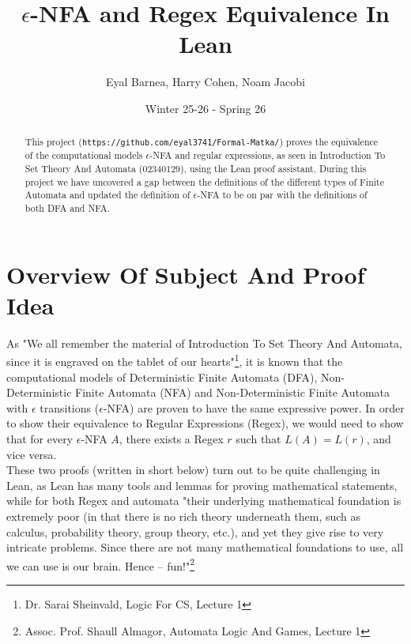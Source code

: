 \documentclass[]{article}
\title{$\epsilon$-NFA and Regex Equivalence In Lean}
\author{Eyal Barnea, Harry Cohen, Noam Jacobi}
\date{Winter 25-26 - Spring 26}
\begin{document}
\maketitle
\begin{abstract}
	This project (\verb|https://github.com/eyal3741/Formal-Matka/|) proves the equivalence of the computational models $\epsilon$-NFA and regular expressions, as seen in Introduction To Set Theory And Automata ($02340129$), using the Lean proof assistant. During this project we have uncovered a gap between the definitions of the different types of Finite Automata and updated the definition of $\epsilon$-NFA to be on par with the definitions of both DFA and NFA.
\end{abstract}
\section{Overview Of Subject And Proof Idea}
As "We all remember the material of Introduction To Set Theory And Automata, since it is engraved on the tablet of our hearts"\footnote{Dr. Sarai Sheinvald, Logic For CS, Lecture 1}, it is known that the computational models of Deterministic Finite Automata (DFA), Non-Deterministic Finite Automata (NFA) and Non-Deterministic Finite Automata with $\epsilon$ transitions ($\epsilon$-NFA) are proven to have the same expressive power. In order to show their equivalence to Regular Expressions (Regex), we would need to show that for every $\epsilon$-NFA $A$, there exists a Regex $r$ such that $L(A)=L(r)$, and vice versa.\\
These two proofs (written in short below) turn out to be quite challenging in Lean, as Lean has many tools and lemmas for proving mathematical statements, while for both Regex and automata "their underlying mathematical foundation is extremely poor (in that there is no rich theory underneath them, such as calculus, probability theory, group theory, etc.), and yet they give rise to very intricate problems. Since there are not many mathematical foundations to use, all we can use is our brain. Hence – fun!"\footnote{Assoc. Prof. Shaull Almagor, Automata Logic And Games, Lecture 1}
\end{document}
